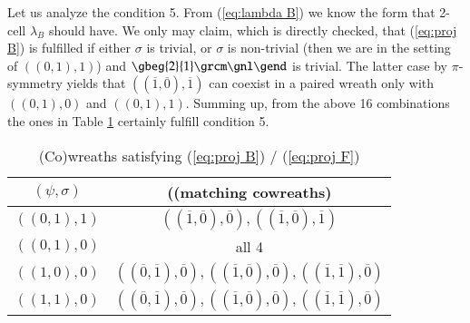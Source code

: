 \documentclass[a4paper, 12pt]{article}
\renewcommand{\_}[1]{\mbox{$_{\left( #1 \right)}$}}
\theoremstyle{plain}
\newcommand{\crta}{\overline}
\newcommand{\equref}[1]{(\ref{eq:#1})}
\begin{document}
Let us analyze the condition 5. From \equref{lambda B} we know the form that 2-cell $\lambda_B$ should have. We only may claim, which is directly checked, 
that \equref{proj B} is fulfilled if either $\sigma$ is trivial, or $\sigma$ is non-trivial (then we are in the setting of $((0,1),1)$) and 
$\gbeg{2}{1}
\grcm \gnl
\gend$ is trivial. %
The latter case by $\pi$-symmetry yields that $((\crta 1,\crta 0),\crta 1)$ can coexist in a paired wreath only with 
$((0,1),0)$ and $((0,1),1)$. Summing up, from the above 16 combinations the %
ones in Table \ref{table:2} certainly fulfill condition 5. %
\begin{table}[h!]
\begin{center}
\begin{tabular}{ c c } %
 $(\psi, \sigma)$ & \hspace{0,2cm} ((matching cowreaths) \\ [0,5ex]
\hline
 $ ((0,1),1)$ & $((\crta 1,\crta 0),\crta 0), ((\crta 1,\crta 0),\crta 1)$  \\ [1ex]
%
  $((0,1),0)$ & all 4  \\ [1ex]
%
$((1,0),0)$ & \hspace{0,8cm}  $((\crta 0,\crta 1),\crta 0), ((\crta 1,\crta 0),\crta 0), ((\crta 1,\crta 1),\crta 0)$  \\ [1ex]   
 $((1,1),0)$ & \hspace{0,8cm}  $((\crta 0,\crta 1),\crta 0), ((\crta 1,\crta 0),\crta 0), ((\crta 1,\crta 1),\crta 0)$  \\ [1ex]
\end{tabular}
\caption{(Co)wreaths satisfying \equref{proj B} / \equref{proj F}}
\label{table:2}
\end{center}
\end{table}
\end{document}
